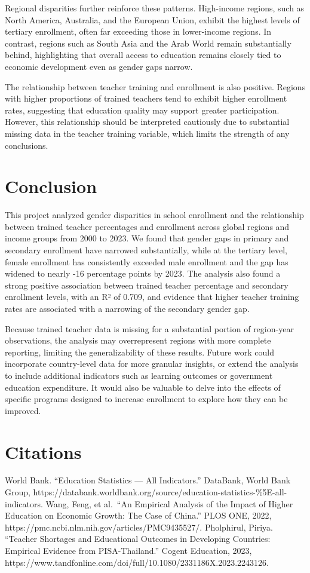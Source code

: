 \documentclass[
  11pt,
]{article}
\begin{document}
Regional disparities further reinforce these patterns. High-income
regions, such as North America, Australia, and the European Union,
exhibit the highest levels of tertiary enrollment, often far exceeding
those in lower-income regions. In contrast, regions such as South Asia
and the Arab World remain substantially behind, highlighting that
overall access to education remains closely tied to economic development
even as gender gaps narrow.

The relationship between teacher training and enrollment is also
positive. Regions with higher proportions of trained teachers tend to
exhibit higher enrollment rates, suggesting that education quality may
support greater participation. However, this relationship should be
interpreted cautiously due to substantial missing data in the teacher
training variable, which limits the strength of any conclusions.

\section{Conclusion}\label{conclusion}

This project analyzed gender disparities in school enrollment and the
relationship between trained teacher percentages and enrollment across
global regions and income groups from 2000 to 2023. We found that gender
gaps in primary and secondary enrollment have narrowed substantially,
while at the tertiary level, female enrollment has consistently exceeded
male enrollment and the gap has widened to nearly -16 percentage points
by 2023. The analysis also found a strong positive association between
trained teacher percentage and secondary enrollment levels, with an R²
of 0.709, and evidence that higher teacher training rates are associated
with a narrowing of the secondary gender gap.

Because trained teacher data is missing for a substantial portion of
region-year observations, the analysis may overrepresent regions with
more complete reporting, limiting the generalizability of these results.
Future work could incorporate country-level data for more granular
insights, or extend the analysis to include additional indicators such
as learning outcomes or government education expenditure. It would also
be valuable to delve into the effects of specific programs designed to
increase enrollment to explore how they can be improved.

\section{Citations}\label{citations}

World Bank. ``Education Statistics --- All Indicators.'' DataBank, World
Bank Group,
https://databank.worldbank.org/source/education-statistics-\%5E-all-indicators.
Wang, Feng, et al.~``An Empirical Analysis of the Impact of Higher
Education on Economic Growth: The Case of China.'' PLOS ONE, 2022,
https://pmc.ncbi.nlm.nih.gov/articles/PMC9435527/. Pholphirul, Piriya.
``Teacher Shortages and Educational Outcomes in Developing Countries:
Empirical Evidence from PISA-Thailand.'' Cogent Education, 2023,
https://www.tandfonline.com/doi/full/10.1080/2331186X.2023.2243126.
\end{document}
